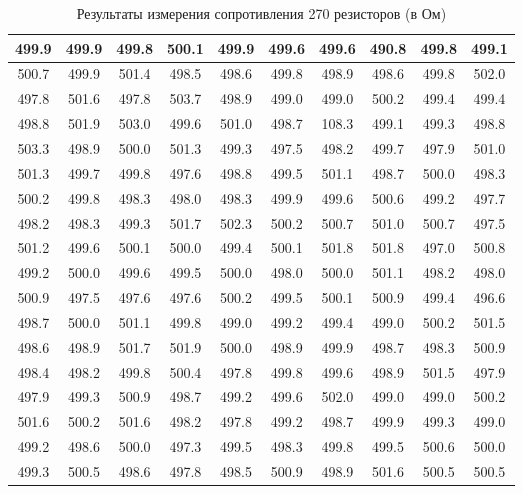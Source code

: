 \documentclass[12pt]{article}
\begin{document}
    \begin{table}[]
        \caption{Результаты измерения сопротивления 270 резисторов (в Ом)}
        \begin{tabular}{|c|c|c|c|c|c|c|c|c|c|}
        \hline
        499.9 & 499.9 & 499.8 & 500.1 & 499.9 & 499.6 & 499.6 & 490.8 & 499.8 & 499.1 \\ \hline
        500.7 & 499.9 & 501.4 & 498.5 & 498.6 & 499.8 & 498.9 & 498.6 & 499.8 & 502.0 \\ \hline
        497.8 & 501.6 & 497.8 & 503.7 & 498.9 & 499.0 & 499.0 & 500.2 & 499.4 & 499.4 \\ \hline
        498.8 & 501.9 & 503.0 & 499.6 & 501.0 & 498.7 & 108.3 & 499.1 & 499.3 & 498.8 \\ \hline
        503.3 & 498.9 & 500.0 & 501.3 & 499.3 & 497.5 & 498.2 & 499.7 & 497.9 & 501.0 \\ \hline
        501.3 & 499.7 & 499.8 & 497.6 & 498.8 & 499.5 & 501.1 & 498.7 & 500.0 & 498.3 \\ \hline
        500.2 & 499.8 & 498.3 & 498.0 & 498.3 & 499.9 & 499.6 & 500.6 & 499.2 & 497.7 \\ \hline
        498.2 & 498.3 & 499.3 & 501.7 & 502.3 & 500.2 & 500.7 & 501.0 & 500.7 & 497.5 \\ \hline
        501.2 & 499.6 & 500.1 & 500.0 & 499.4 & 500.1 & 501.8 & 501.8 & 497.0 & 500.8 \\ \hline
        499.2 & 500.0 & 499.6 & 499.5 & 500.0 & 498.0 & 500.0 & 501.1 & 498.2 & 498.0 \\ \hline
        500.9 & 497.5 & 497.6 & 497.6 & 500.2 & 499.5 & 500.1 & 500.9 & 499.4 & 496.6 \\ \hline
        498.7 & 500.0 & 501.1 & 499.8 & 499.0 & 499.2 & 499.4 & 499.0 & 500.2 & 501.5 \\ \hline
        498.6 & 498.9 & 501.7 & 501.9 & 500.0 & 498.9 & 499.9 & 498.7 & 498.3 & 500.9 \\ \hline
        498.4 & 498.2 & 499.8 & 500.4 & 497.8 & 499.8 & 499.6 & 498.9 & 501.5 & 497.9 \\ \hline
        497.9 & 499.3 & 500.9 & 498.7 & 499.2 & 499.6 & 502.0 & 499.0 & 499.0 & 500.2 \\ \hline
        501.6 & 500.2 & 501.6 & 498.2 & 497.8 & 499.2 & 498.7 & 499.9 & 499.3 & 499.0 \\ \hline
        499.2 & 498.6 & 500.0 & 497.3 & 499.5 & 498.3 & 499.8 & 499.5 & 500.6 & 500.0 \\ \hline
        499.3 & 500.5 & 498.6 & 497.8 & 498.5 & 500.9 & 498.9 & 501.6 & 500.5 & 500.5 \\ \hline

\end{tabular}
\end{table}
\end{document}
